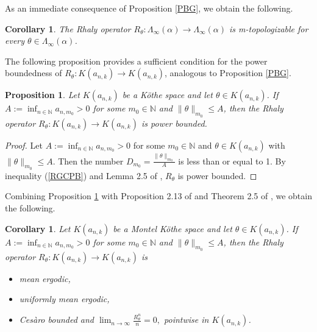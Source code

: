 \documentclass{birkjour}
\newtheorem{cor}[thm]{Corollary}
\newtheorem{prop}[thm]{Proposition}
\theoremstyle{definition}
\theoremstyle{remark}
\numberwithin{equation}{section}
\begin{document}
As an immediate consequence of Proposition \ref{PBG}, we obtain the following.

\begin{cor}\label{IMT} The Rhaly operator $R_{\theta}:\Lambda_{\infty}(\alpha)\to \Lambda_{\infty}(\alpha)$ is m-topologizable for every $\theta\in \Lambda_{\infty}(\alpha)$.
\end{cor}

The following proposition provides a sufficient condition for the power 
boundedness of $R_{\theta}:K(a_{n,k})\to K(a_{n,k})$, analogous to 
Proposition \ref{PBG}.


\begin{prop}\label{PPG} Let $K(a_{n,k})$ be a Köthe space and let $\theta\in K(a_{n,k})$. If $\displaystyle A:=\inf_{n\in \mathbb{N}}a_{n,m_{0}}>0$ for some $m_{0}\in \mathbb{N}$ and $\displaystyle \|\theta\|_{m_{0}}\leq A$, then the Rhaly operator $R_{\theta}:K(a_{n,k})\to K(a_{n,k})$ is power bounded.
\end{prop}
\begin{proof} Let $A:=\inf_{n\in \mathbb{N}}a_{n,m_{0}}>0$ for some $m_0\in \mathbb{N}$ and  $\theta\in K(a_{n,k})$ with $ \|\theta\|_{m_{0}}\leq A$. Then the number $\displaystyle D_{m_{0}}=\frac{\|\theta\|_{m_{0}}}{A}$ is less than or equal to 1. By inequality (\ref{RGCPB}) and Lemma 2.5 of \cite{N3}, $R_{\theta}$ is power bounded. 
\end{proof}

Combining Proposition \ref{PPG} with  Proposition 2.13 of \cite{ABR} and Theorem 2.5 of \cite{K1}, 
we obtain the following.

\begin{cor}
 Let $K(a_{n,k})$ be a Montel Köthe space and let $\theta\in K(a_{n,k})$. If $\displaystyle A:=\inf_{n\in \mathbb{N}}a_{n,m_{0}}>0$ for some $m_{0}\in \mathbb{N}$ and $\displaystyle \|\theta\|_{m_{0}}\leq A$,  then the Rhaly operator $R_{\theta}:K(a_{n,k})\to K(a_{n,k})$ is 
\begin{itemize}
\item[i.] mean ergodic,
\item[ii.] uniformly mean ergodic, 
\item[iii.] Ces\`{a}ro bounded and $\displaystyle \lim_{n\to \infty} \frac{R^{n}_{\theta}}{n}=0,$ pointwise in $K(a_{n,k})$.
\end{itemize}
\end{cor}
\end{document}
